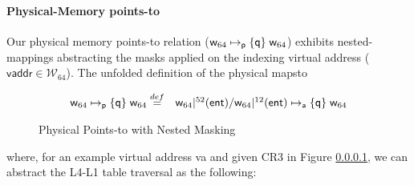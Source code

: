 \paragraph{Physical-Memory points-to} Our physical memory points-to relation ($\mathsf{w}_{64}\mapsto_{\mathsf{p}}\{\mathsf{q}\}\;\mathsf{w}_{64}$) exhibits nested-mappings abstracting the  masks applied on the indexing virtual address ($\textsf{vaddr}\in\mathcal{W}_{64}$). The unfolded definition of the physical mapsto 
\begin{figure}[!ht]
\[
\begin{array}{cl}
\mathsf{w}_{64}\mapsto_{\mathsf{p}}\{\mathsf{q}\}\;\mathsf{w}_{64} \stackrel{def}{=} & \mathsf{w}_{64}|^{52}(\textsf{ent}) / \mathsf{w}_{64}|^{12}(\textsf{ent}) \mapsto_{\mathsf{a}}\{\mathsf{q}\}\;\mathsf{w}_{64}
\end{array}
\]
\caption{Physical Points-to with Nested Masking}
  \label{fig:physicalpointsto}
\end{figure}
where, for an example virtual address \textsf{va} and given \textsf{CR3} in Figure \ref{}, we can abstract the L4-L1 table traversal as the following:
